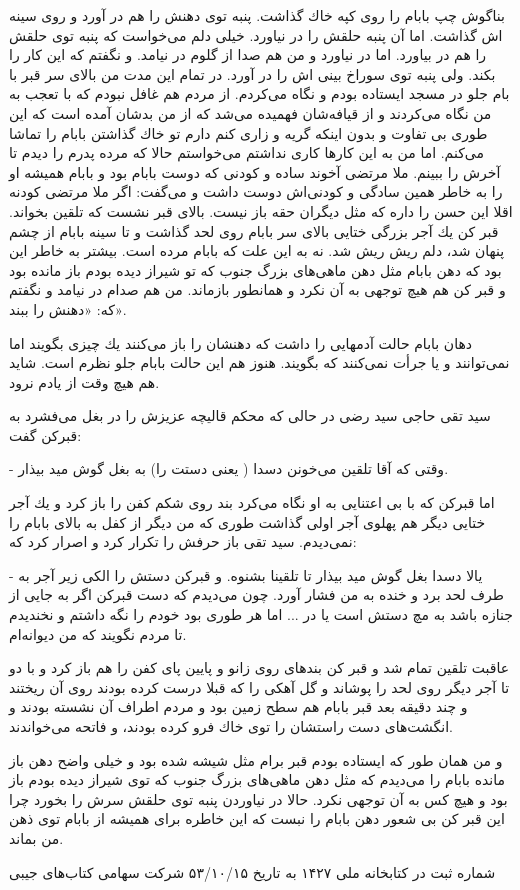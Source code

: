 \documentclass[12pt,a4paper]{book}
\begin{document}
بناگوش چپ بابام را روی کپه خاك گذاشت. پنبه توی دهنش را هم در آورد و روی سینه اش گذاشت. اما آن پنبه حلقش را در نیاورد. خیلی دلم می‌خواست که پنبه توی حلقش را هم در بیاورد. اما در نیاورد و من هم صدا از گلوم در نیامد. و نگفتم که این کار را بکند. ولی پنبه توی سوراخ بینی اش را در آورد.
در تمام این مدت من بالای سر قبر با بام جلو در مسجد
ایستاده بودم و نگاه می‌کردم. از مردم هم غافل نبودم که با تعجب به من نگاه می‌کردند و از قیافه‌شان فهمیده می‌شد که از من بدشان آمده است که این طوری بی تفاوت و بدون اینکه گریه و زاری کنم دارم تو خاك گذاشتن بابام را تماشا می‌کنم. اما من به این کارها کاری نداشتم می‌خواستم حالا که مرده پدرم را دیدم تا آخرش را ببینم. ملا مرتضی آخوند ساده و کودنی که دوست بابام بود و بابام همیشه او را به خاطر همین سادگی و کودنی‌اش دوست داشت و می‌گفت: اگر ملا مرتضی کودنه اقلا این حسن را داره که مثل دیگران حقه باز نیست. بالای قبر نشست که تلقين بخواند. قبر کن يك آجر بزرگی ختایی بالای سر بابام روی لحد گذاشت و تا سينه بابام از چشم پنهان شد، دلم ریش ریش شد. نه به این علت که بابام مرده است. بیشتر به خاطر این بود که دهن بابام مثل دهن ماهی‌های بزرگ جنوب که تو شیراز دیده بودم باز مانده بود و قبر کن هم هیچ توجهی به آن نکرد و همانطور بازماند. من هم صدام در نیامد و نگفتم که: «دهنش را ببند».

دهان بابام حالت آدمهایی را داشت که دهنشان را باز می‌کنند يك چیزی بگویند اما نمی‌توانند و یا جرأت نمی‌کنند که بگویند. هنوز هم این حالت بابام جلو نظرم است. شاید هم هیچ وقت از یادم نرود.

سید تقی حاجی سید رضی در حالی که محكم قالیچه عزیزش را در بغل می‌فشرد به قبرکن گفت:

- وقتی که آقا تلقین می‌خونن دسدا ( یعنی دستت را) به بغل گوش مید بیذار.

اما قبرکن که با بی اعتنایی به او نگاه می‌کرد بند روی شکم کفن را باز کرد و يك آجر ختایی دیگر هم پهلوی آجر اولی گذاشت طوری که من دیگر از کفل به بالای بابام را نمی‌دیدم. سید تقی باز حرفش را تکرار کرد و اصرار کرد که:

- یالا دسدا بغل گوش مید بیذار تا تلقينا بشنوه. و قبرکن دستش را الکی زیر آجر به طرف لحد برد و خنده به من فشار آورد. چون می‌دیدم که دست قبرکن اگر به جایی از جنازه باشد به مچ دستش است یا در ... اما هر طوری بود خودم را نگه داشتم و نخندیدم تا مردم نگویند که من دیوانه‌ام.

عاقبت تلقين تمام شد و قبر کن بندهای روی زانو و پایین پای کفن را هم باز کرد و با دو تا آجر دیگر روی لحد را پوشاند و گل آهکی را که قبلا درست کرده بودند روی آن ریختند و چند دقیقه بعد قبر بابام هم سطح زمین بود و مردم اطراف آن نشسته بودند و انگشت‌های دست راستشان را توی خاك فرو کرده بودند، و فاتحه می‌خواندند.

و من همان طور که ایستاده بودم قبر برام مثل شیشه شده بود و خیلی واضح دهن باز مانده بابام را می‌دیدم که مثل دهن ماهی‌های بزرگ جنوب که توی شیراز دیده بودم باز بود و هیچ کس به آن توجهی نکرد. حالا در نیاوردن پنبه توی حلقش سرش را بخورد چرا این قبر کن بی شعور دهن بابام را نبست که این خاطره برای همیشه از بابام توی ذهن من بماند.

\begin{thebibliography}{99}
\bibitem{}
شماره ثبت در کتابخانه ملی ۱۴۲۷ به تاریخ ۵۳/۱۰/۱۵
\bibitem{}
شرکت سهامی کتاب‌های جیبی
\end{thebibliography}
\end{document}
